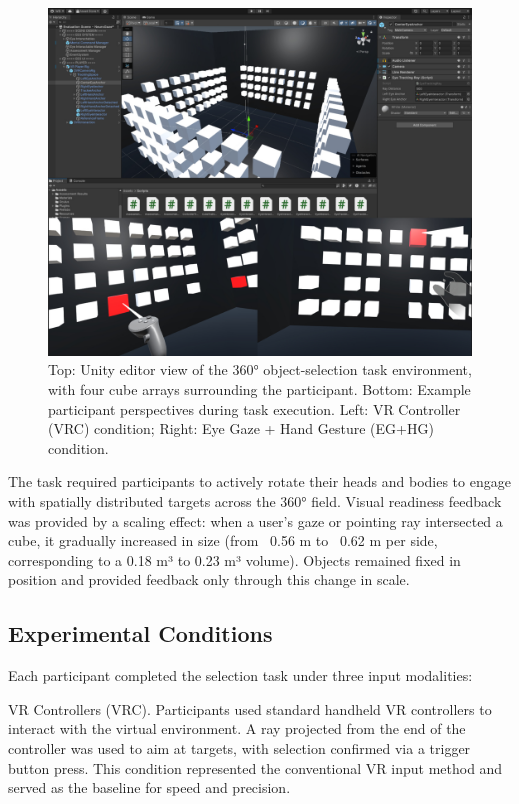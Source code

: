 \documentclass[utf8]{FrontiersinHarvard} %
\begin{document}
\begin{figure}[ht]
\begin{center}
\includegraphics[width=15cm]{figures/unity.jpg}
\end{center}
\caption{Top: Unity editor view of the 360° object-selection task environment, with four cube arrays surrounding the participant. Bottom: Example participant perspectives during task execution. Left: VR Controller (VRC) condition; Right: Eye Gaze + Hand Gesture (EG+HG) condition.}
\label{fig:unity}
\end{figure}

The task required participants to actively rotate their heads and bodies to engage with spatially distributed targets across the 360° field. Visual readiness feedback was provided by a scaling effect: when a user's gaze or pointing ray intersected a cube, it gradually increased in size (from ~0.56 m to ~0.62 m per side, corresponding to a 0.18 m³ to 0.23 m³ volume). Objects remained fixed in position and provided feedback only through this change in scale.


\subsection{Experimental Conditions}
Each participant completed the selection task under three input modalities:

VR Controllers (VRC). Participants used standard handheld VR controllers to interact with the virtual environment. A ray projected from the end of the controller was used to aim at targets, with selection confirmed via a trigger button press. This condition represented the conventional VR input method and served as the baseline for speed and precision.
\end{document}
